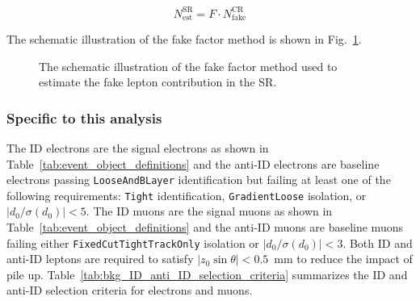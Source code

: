 \begin{equation}
    N^\mathrm{SR}_\mathrm{est} = F \cdot N^\mathrm{CR}_\mathrm{fake}
    \label{eq:bkg_estimated_fake_leptons}
\end{equation}

The schematic illustration of the fake factor method is shown in Fig.~\ref{fig:bkg_fake_factor_method}.

\begin{figure}[htb]
    \begin{center}
        
        \caption{The schematic illustration of the fake factor method used to estimate the fake lepton contribution in the SR.}
        \label{fig:bkg_fake_factor_method}
    \end{center}
\end{figure}


\subsubsection{Specific to this analysis}
\label{subsubsec:bkg_fake_specific}
The ID electrons are the signal electrons as shown in Table~\ref{tab:event_object_definitions} and the anti-ID electrons are baseline electrons passing \texttt{LooseAndBLayer} identification but failing at least one of the following requirements: \texttt{Tight} identification, \texttt{GradientLoose} isolation, or $|d_{0}/\sigma(d_{0})| < 5$.
The ID muons are the signal muons as shown in Table~\ref{tab:event_object_definitions} and the anti-ID muons are baseline muons failing either \texttt{FixedCutTightTrackOnly} isolation or $|d_{0}/\sigma(d_{0})| < 3$.
Both ID and anti-ID leptons are required to satisfy $|z_{0} \sin \theta| < 0.5$~mm to reduce the impact of pile up.
Table~\ref{tab:bkg_ID_anti_ID_selection_criteria} summarizes the ID and anti-ID selection criteria for electrons and muons.


